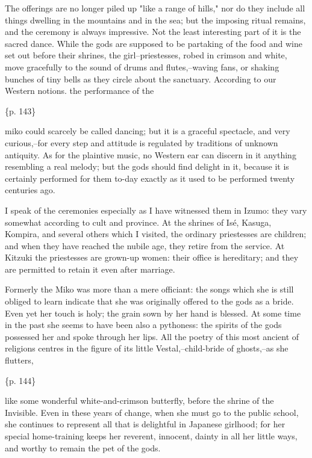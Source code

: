 The offerings are no longer piled up "like a range of hills," nor do they include all things dwelling in the mountains and in the sea; but the imposing ritual remains, and the ceremony is always impressive. Not the least interesting part of it is the sacred dance. While the gods are supposed to be partaking of the food and wine set out before their shrines, the girl--priestesses, robed in crimson and white, move gracefully to the sound of drums and flutes,--waving fans, or shaking bunches of tiny bells as they circle about the sanctuary. According to our Western notions. the performance of the

\{p. 143\}

miko could scarcely be called dancing; but it is a graceful spectacle, and very curious,--for every step and attitude is regulated by traditions of unknown antiquity. As for the plaintive music, no Western ear can discern in it anything resembling a real melody; but the gods should find delight in it, because it is certainly performed for them to-day exactly as it used to be performed twenty centuries ago.

I speak of the ceremonies especially as I have witnessed them in Izumo: they vary somewhat according to cult and province. At the shrines of Isé, Kasuga, Kompira, and several others which I visited, the ordinary priestesses are children; and when they have reached the nubile age, they retire from the service. At Kitzuki the priestesses are grown-up women: their office is hereditary; and they are permitted to retain it even after marriage.



Formerly the Miko was more than a mere officiant: the songs which she is still obliged to learn indicate that she was originally offered to the gods as a bride. Even yet her touch is holy; the grain sown by her hand is blessed. At some time in the past she seems to have been also a pythoness: the spirits of the gods possessed her and spoke through her lips. All the poetry of this most ancient of religions centres in the figure of its little Vestal,--child-bride of ghosts,--as she flutters,

\{p. 144\}

like some wonderful white-and-crimson butterfly, before the shrine of the Invisible. Even in these years of change, when she must go to the public school, she continues to represent all that is delightful in Japanese girlhood; for her special home-training keeps her reverent, innocent, dainty in all her little ways, and worthy to remain the pet of the gods.



